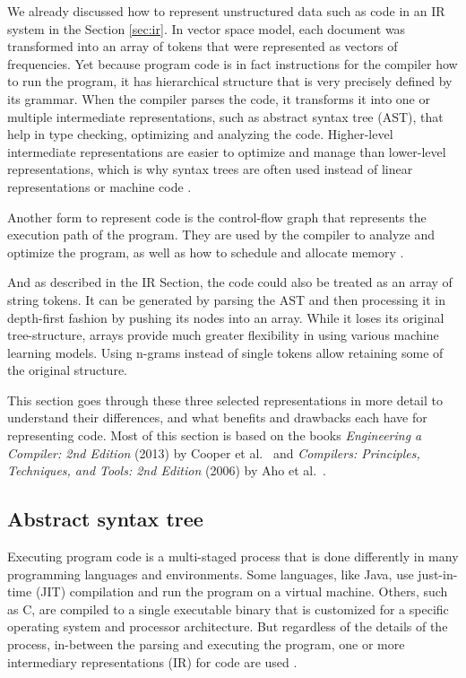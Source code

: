 We already discussed how to represent unstructured data such as code in an IR system in the Section \ref{sec:ir}. In vector space model, each document was transformed into an array of tokens that were represented as vectors of frequencies. Yet because program code is in fact instructions for the compiler how to run the program, it has hierarchical structure that is very precisely defined by its grammar. When the compiler parses the code, it transforms it into one or multiple intermediate representations, such as abstract syntax tree (AST), that help in type checking, optimizing and analyzing the code. Higher-level intermediate representations are easier to optimize and manage than lower-level representations, which is why syntax trees are often used instead of linear representations or machine code \cite{aho2007compilers}.

Another form to represent code is the control-flow graph that represents the execution path of the program. They are used by the compiler to analyze and optimize the program, as well as how to schedule and allocate memory \cite{engineering-compiler}.

And as described in the IR Section, the code could also be treated as an array of string tokens. It can be generated by parsing the AST and then processing it in depth-first fashion by pushing its nodes into an array. While it loses its original tree-structure, arrays provide much greater flexibility in using various machine learning models. Using n-grams instead of single tokens allow retaining some of the original structure.

This section goes through these three selected representations in more detail to understand their differences, and what benefits and drawbacks each have for representing code. Most of this section is based on the books \textit{Engineering a Compiler: 2nd Edition} (2013) by Cooper et al.~\cite{engineering-compiler} and \textit{Compilers: Principles, Techniques, and Tools: 2nd Edition} (2006) by Aho et al.~\cite{aho2007compilers}.

\subsection{Abstract syntax tree}
\label{ssec:ast}

Executing program code is a multi-staged process that is done differently in many programming languages and environments. Some languages, like Java, use just-in-time (JIT) compilation and run the program on a virtual machine. Others, such as C, are compiled to a single executable binary that is customized for a specific operating system and processor architecture. But regardless of the details of the process, in-between the parsing and executing the program, one or more intermediary representations (IR) for code are used \cite{aho2007compilers}.

